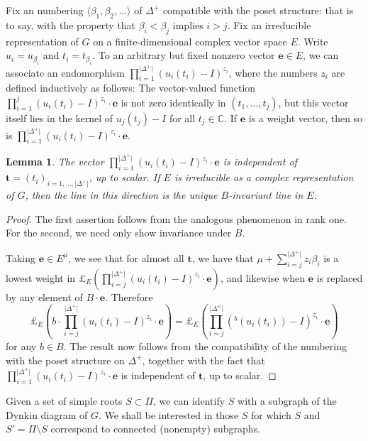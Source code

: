 \documentclass{amsart}
\theoremstyle{plain}
\newtheorem{lemma}[theorem]{Lemma}
\theoremstyle{definition}
\theoremstyle{remark}
\newcommand{\Vect}[1]{\mathbold{#1}}
\providecommand{\abs}[1]{\lvert#1\rvert}
\begin{document}
Fix an numbering $\langle \beta_{1}, \beta_{2}, \ldots \rangle$ of
$\Delta^{+}$ compatible with the poset structure: that is to say, with the
property that $\beta_{i} < \beta_{j}$ implies $i > j$. Fix an irreducible representation of $G$ on a finite-dimensional complex vector space $E$. Write
$u_{i} = u_{\beta_{i}}$ and $t_{i} = t_{\beta_{i}}$. To an
arbitrary but fixed nonzero vector $\Vect{e}
\in E$, we can associate an endomorphism
$\prod_{i = 1}^{\abs{\Delta^{+}}} (u_{i}(t_{i}) - I)^{z_{i}}$,
where the numbers $z_{i}$ are defined inductively as follows:
The vector-valued function
$\prod_{i = 1}^{j} (u_{i}(t_{i}) - I)^{z_{i}} \cdot \Vect{e}$
is not zero identically in $(t_{1}, \ldots, t_{j})$, but this vector itself lies
in the kernel of $u_{j}(t_{j}) - I$ for all $t_{j} \in \mathbb{C}$. If $\Vect{e}$ is a
weight vector, then so is $\prod_{i = 1}^{\abs{\Delta^{+}}} (u_{i}(t_{i}) - I)^{z_{i}}
\cdot \Vect{e}$.
\begin{lemma}\label{lem:raisingoperators}
The vector
$\prod_{i = 1}^{\abs{\Delta^{+}}} (u_{i}(t_{i}) - I)^{z_{i}} \cdot \Vect{e}$
is independent of $\Vect{t} = (t_{i})_{i = 1, \ldots, \abs{\Delta^{+}}}$, up to scalar. If
$E$ is
irreducible as a complex representation of $G$, then the line in this direction is
the unique $B$-invariant line in $E$.
\end{lemma}
\begin{proof}
The first assertion follows from the analogous phenomenon in rank one. For the second,
we need only show invariance under $B$.

Taking $\Vect{e} \in E^{\mu}$, we see that for almost all $\Vect{t}$, we have that $\mu
+ \sum_{i = j}^{\abs{\Delta^{+}}} z_{i}\beta_{i}$ is a lowest weight in
$\pounds_{E}\left(\prod_{i = j}^{\abs{\Delta^{+}}}(u_{i}(t_{i}) - I)^{z_{i}} \cdot
\Vect{e}\right)$, and likewise when $\Vect{e}$ is replaced by any element of $B \cdot
\Vect{e}$. Therefore
$$\pounds_{E}\left(b \cdot \prod_{i = j}^{\abs{\Delta^{+}}}(u_{i}(t_{i}) - I)^{z_{i}} \cdot
\Vect{e}\right) = \pounds_{E}\left(\prod_{i = j}^{\abs{\Delta^{+}}}(\mbox{}^{b}(u_{i}(t_{i})) -
I)^{z_{i}} \cdot
\Vect{e}\right)$$
for any $b \in B$. The result now follows from the compatibility of the numbering with
the poset structure on $\Delta^{+}$, together with the fact that $\prod_{i = 1}^{\abs{\Delta^{+}}} (u_{i}(t_{i}) - I)^{z_{i}} \cdot \Vect{e}$
is independent of $\Vect{t}$, up to scalar.
\end{proof}

Given a set of simple roots $S \subset \Pi$, we can identify $S$
with a subgraph of the Dynkin diagram of $G$. We shall be
interested in those $S$ for which $S$ and $S' = \Pi \setminus S$
correspond to connected (nonempty) subgraphs.
\end{document}
